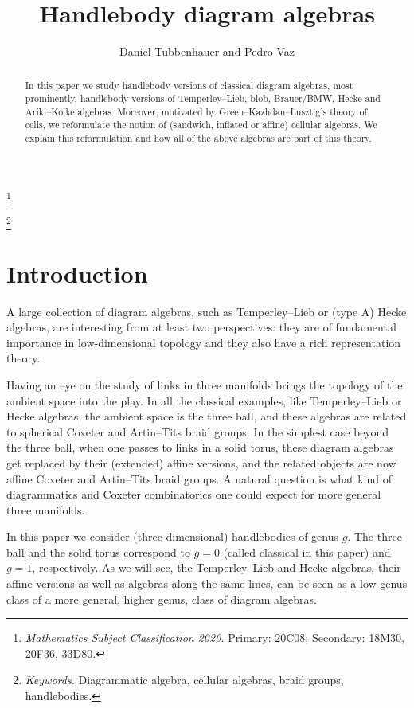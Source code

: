 \documentclass[a4paper,11pt]{amsart}
\title[Handlebody diagram algebras]
{Handlebody diagram algebras}
\author[Daniel Tubbenhauer and Pedro Vaz]{Daniel Tubbenhauer and Pedro Vaz}
\numberwithin{equation}{section}
\renewcommand{\theequation}{\thesection-\arabic{equation}}
\newcommand{\nnfootnote}[1]{%
\begin{NoHyper}
\renewcommand\thefootnote{}\footnote{#1}%
\addtocounter{footnote}{-1}%
\end{NoHyper}
}
\begin{document}
\begin{abstract}
In this paper we study handlebody versions 
of classical diagram algebras, most prominently, 
handlebody versions of Temperley--Lieb, blob, 
Brauer/BMW, Hecke and Ariki--Koike algebras.
Moreover, motivated by Green--Kazhdan--Lusztig's 
theory of cells, we reformulate the notion of 
(sandwich, inflated or affine) cellular algebras.
We explain this reformulation
and how all of the above algebras 
are part of this theory.
\end{abstract}

\nnfootnote{\textit{Mathematics Subject Classification 2020.} Primary: 20C08; Secondary: 18M30, 20F36, 33D80.}
\nnfootnote{\textit{Keywords.} Diagrammatic algebra, cellular algebras, braid groups, handlebodies.}

\renewcommand{\theequation}{\thesection-\arabic{equation}}


\maketitle

\tableofcontents

\section{Introduction}\label{section:intro}

A large collection of diagram algebras, such as Temperley--Lieb 
or (type A) Hecke algebras, are interesting from at least two perspectives:
they are of fundamental importance in low-dimensional topology 
and they also have a rich representation theory.

Having an eye on the study of links in 
three manifolds brings the topology of the ambient space into the play.
In all the classical examples, like Temperley--Lieb or 
Hecke algebras, the ambient space is the three ball, and these algebras 
are related to spherical Coxeter and Artin--Tits braid groups.
In the simplest case beyond the three ball, 
when one passes to links in a solid torus, 
these diagram algebras get replaced by their (extended) affine versions, 
and the related objects are now affine Coxeter and Artin--Tits braid groups.
A natural question is what kind of diagrammatics and Coxeter combinatorics 
one could expect for more general three manifolds.

In this paper we consider (three-dimensional) handlebodies of genus $g$. 
The three ball and the solid torus correspond to 
$g=0$ (called classical in this paper) and $g=1$, respectively.
As we will see, the Temperley--Lieb and Hecke algebras, their 
affine versions as well 
as algebras along the same lines, 
can be seen as a low genus class
of a more general, higher genus, class of diagram algebras.
\end{document}
